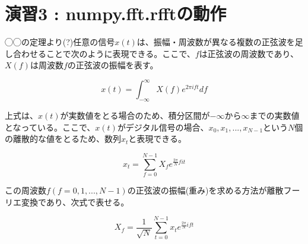 \documentclass[a4paper,11pt]{jsarticle}
\begin{document}
\section{演習3 : numpy.fft.rfftの動作}
◯◯の定理より(?)任意の信号$x(t)$は、振幅・周波数が異なる複数の正弦波を足し合わせることで次のように表現できる。ここで、$f$は正弦波の周波数であり、$X(f)$は周波数$f$の正弦波の振幅を表す。

$$ x(t) = \int_{-\infty}^{\infty} X(f)e^{2\pi ift} df $$

上式は、$x(t)$が実数値をとる場合のため、積分区間が$-\infty$から$\infty$までの実数値となっている。ここで、$x(t)$がデジタル信号の場合、$x_0, x_1, ..., x_{N-1}$という$N$個の離散的な値をとるため、数列$x_t$と表現できる。

$$ x_t = \sum_{f=0}^{N-1} X_f e^{\frac{2\pi}{N}fit} $$

この周波数$f (f=0,1,...,N-1)$の正弦波の振幅(重み)を求める方法が離散フーリエ変換であり、次式で表せる。

$$ X_f = \frac{1}{\sqrt{N}} \sum_{t=0}^{N-1} x_t e^{\frac{2\pi}{N}ift} $$
\end{document}
